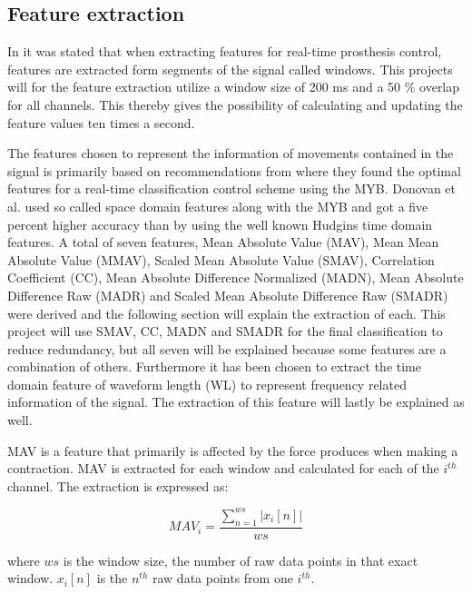 \subsection{Feature extraction} \label{sub:M:featureExtraction}

In  it was stated that when extracting features for real-time prosthesis control, features are extracted form segments of the signal called windows. This projects will for the feature extraction utilize a window size of 200 ms and a 50 \% overlap for all channels. This thereby gives the possibility of calculating and updating the feature values ten times a second.    

The features chosen to represent the information of movements contained in the signal is primarily based on recommendations from \cite{Donovan2017} where they found the optimal features for a real-time classification control scheme using the MYB. Donovan et al. \cite{Donovan2017} used so called space domain features along with the MYB and got a five percent higher accuracy than by using the well known Hudgins time domain features. A total of seven features, Mean Absolute Value (MAV), Mean Mean Absolute Value (MMAV), Scaled Mean Absolute Value (SMAV), Correlation Coefficient (CC), Mean Absolute Difference Normalized (MADN), Mean Absolute Difference Raw (MADR) and Scaled Mean Absolute Difference Raw (SMADR) were derived and the following section will explain the extraction of each. This project will use SMAV, CC, MADN and SMADR for the final classification to reduce redundancy, but all seven will be explained because some features are a combination of others. \cite{Donovan2017} Furthermore it has been chosen to extract the time domain feature of waveform length (WL) to represent frequency related information of the signal. The extraction of this feature will lastly be explained as well. 

MAV is a feature that primarily is affected by the force produces when making a contraction. MAV is extracted for each window and calculated for each of the $i^{th}$ channel. The extraction is expressed as:

\begin{equation} \label{eq:MAV}
MAV_i=\frac{\sum_{n=1}^{ws}|x_i[n]|}{ws}
\end{equation}
  
where $ws$ is the window size, the number of raw data points in that exact window. $x_i[n]$ is the $n^{th}$ raw data points from one $i^{th}$.  

